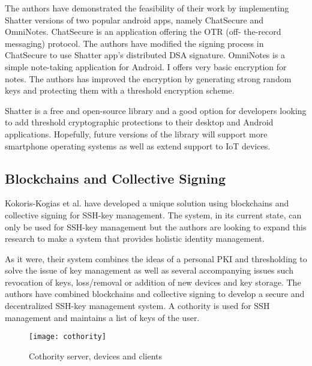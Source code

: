The authors have demonstrated the feasibility of their work by implementing Shatter versions of two popular android apps, namely ChatSecure and OmniNotes. ChatSecure is an application offering the OTR (off- the-record messaging) protocol. The authors have modified the signing process in ChatSecure to use Shatter app's distributed DSA signature. OmniNotes is a simple note-taking application for Android. I offers very basic encryption for notes. The authors has improved the encryption by generating strong random keys and protecting them with a threshold encryption scheme.

Shatter is a free and open-source library and a good option for developers looking to add threshold cryptographic protections to their desktop and Android applications. Hopefully, future versions of the library will support more smartphone operating systems as well as extend support to IoT devices.

 

\subsection{Blockchains and Collective Signing}
Kokoris-Kogias et al.\cite{Kokoris-kogias} have developed a unique solution using blockchains and collective signing for SSH-key management. The system, in its current state, can only be used for SSH-key management but the authors are looking to expand this research to make a system that provides holistic identity management.

As it were, their system combines the ideas of a personal PKI and thresholding to solve the issue of key management as well as several accompanying issues such revocation of keys, loss/removal or addition of new devices and key storage. The authors have combined blockchains and collective signing to develop a secure and decentralized SSH-key management system. A cothority\cite{Syta} is used for SSH management and maintains a list of keys of the user.

\begin{figure}[h]
			\centering
			\texttt{[image: cothority]}
			\caption{Cothority server, devices and clients \cite{Kokoris-kogias}}
			\label{fig:cotho}
		\end{figure}
		

